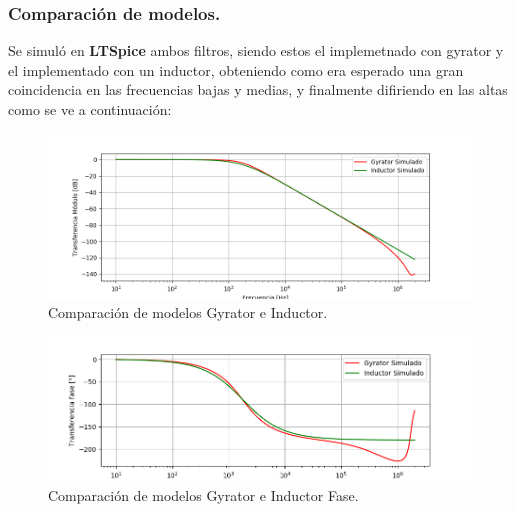 \subsubsection{Comparación de modelos.}
Se simuló en \textbf{LTSpice} ambos filtros, siendo estos el implemetnado con gyrator y el implementado con un inductor, obteniendo como era esperado una gran coincidencia en las frecuencias bajas y medias, y finalmente difiriendo en las altas como se ve a continuación:
\begin{figure}[H]	
	\centering
	\includegraphics[width=\textwidth]{ImagenesEj2/simLP.PNG}
	\caption{Comparación de modelos Gyrator e Inductor.}
	\label{fig:gyrIndL}
\end{figure}
\begin{figure}[H]	
	\centering
	\includegraphics[width=\textwidth]{ImagenesEj2/simLPP.PNG}
	\caption{Comparación de modelos Gyrator e Inductor Fase.}
	\label{fig:gyrIndPL}
\end{figure}
